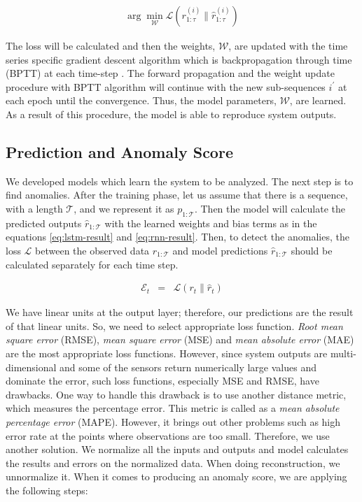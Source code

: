 \begin{eqnarray}
    \arg\min_{\boldsymbol{\mathcal{W}}} \mathcal{L} \left(r_{1:\tau}^{(i)} \| \hat{r}_{1:\tau}^{(i)}\right)
\end{eqnarray}

The loss will be calculated and then the weights, $\boldsymbol{\mathcal{W}}$, are updated with the time series specific gradient descent algorithm which is backpropagation through time (BPTT) at each time-step \cite{werbos1990backpropagation}. The forward propagation and the weight update procedure with BPTT algorithm will continue with the new sub-sequences $i^\prime$ at each epoch until the convergence. Thus, the model parameters, $\boldsymbol{\mathcal{W}}$, are learned. As a result of this procedure, the model is able to reproduce system outputs.

\subsection{Prediction and Anomaly Score}

We developed models which learn the system to be analyzed. 
The next step is to find anomalies.
After the training phase, let us assume that there is a sequence, with a length $\mathcal{T}$, and we represent it as $p_{1:\mathcal{T}}$. 
Then the model will calculate the predicted outputs $\hat{r}_{1:\mathcal{T}}$ with the learned weights and bias terms as in the equations \ref{eq:lstm-result} and \ref{eq:rnn-result}.
Then, to detect the anomalies, the loss $\mathcal{L}$ between the observed data $r_{1:\mathcal{T}}$ and model predictions $\hat{r}_{1:\mathcal{T}}$ should be calculated separately for each time step.

\begin{eqnarray}
    \mathcal{E}_t &=& \mathcal{L} \left(r_t \| \hat{r}_t\right)
\end{eqnarray}

We have linear units at the output layer; therefore, our predictions are the result of that linear units.
So, we need to select appropriate loss function. 
{\it Root mean square error} (RMSE), {\it mean square error} (MSE) and {\it mean absolute error} (MAE) are the most appropriate loss functions.
However, since system outputs are multi-dimensional and some of the sensors return numerically large values and dominate the error, such loss functions, especially MSE and RMSE, have drawbacks.
One way to handle this drawback is to use another distance metric, which measures the percentage error. This metric is called as a {\it mean absolute percentage error} (MAPE). However, it brings out other problems such as high error rate at the points where observations are too small.
Therefore, we use another solution.
We normalize all the inputs and outputs and model calculates the results and errors on the normalized data. When doing reconstruction, we unnormalize it. When it comes to producing an anomaly score, we are applying the following steps:

